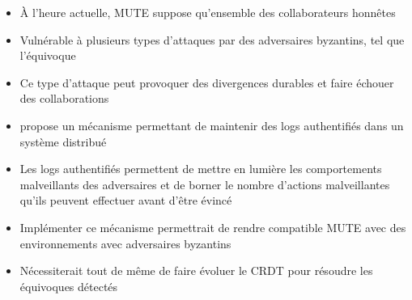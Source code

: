 \begin{itemize}
    \item À l'heure actuelle, MUTE suppose qu'ensemble des collaborateurs honnêtes
    \item Vulnérable à plusieurs types d'attaques par des adversaires byzantins, tel que l'équivoque
    \item Ce type d'attaque peut provoquer des divergences durables et faire échouer des collaborations
    \item \textcite{2021-these-vic} propose un mécanisme permettant de maintenir des logs authentifiés dans un système distribué
    \item Les logs authentifiés permettent de mettre en lumière les comportements malveillants des adversaires et de borner le nombre d'actions malveillantes qu'ils peuvent effectuer avant d'être évincé
    \item Implémenter ce mécanisme permettrait de rendre compatible MUTE avec des environnements avec adversaires byzantins
    \item Nécessiterait tout de même de faire évoluer le \ac{CRDT} pour résoudre les équivoques détectés
  \end{itemize}
